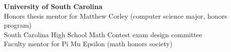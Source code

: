     \textbf{University of South Carolina}\\
    Honors thesis mentor for
    Matthew Corley (computer science major, honors program)\\ 
    South Carolina High School Math Contest exam design committee\\
    Faculty mentor for Pi Mu Epsilon (math honors society) \\[6pt]


